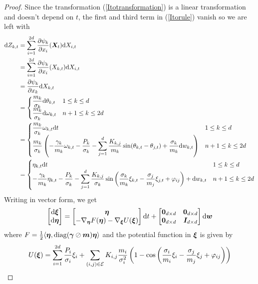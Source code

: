 \documentclass[11pt,twoside,a4paper]{article}
\begin{document}
\begin{proof}
Since the transformation (\ref{Itotransformation}) is a linear transformation and doesn't depend on $t$, the first and third term in (\ref{Itorule})  vanish so we are left with
\begin{align}
    {\rm{d}} Z_{k,t}& = \sum_{i=1}^{2d} \frac{\partial \psi_k}{\partial x_i}({\bm{X}}_t) {\rm{d}} X_{i,t} \nonumber \\ &= \sum_{i=1}^{2d} \frac{\partial \psi_k}{\partial x_i}(X_{k,t}) {\rm{d}} X_{i,t} \nonumber  \\
    &= \frac{\partial \psi_k}{\partial x_k} {\rm{d}} X_{k,t} \nonumber \\ 
    & = \begin{cases}
    \dfrac{m_k}{\sigma_k}{\rm{d}} \theta_{k,t} & 1\leq k \leq d \nonumber \\ 
     \dfrac{m_k}{\sigma_k}{\rm{d}} \omega_{k,t} & n+1 \leq k \leq 2d \\ 
    \end{cases} \nonumber \\ 
    &=  \begin{cases}
    \dfrac{m_k}{\sigma_k} \omega_{k,t} {\rm{d}} t & 1\leq k \leq d \nonumber \\ 
  \dfrac{m_k}{\sigma_k}  \left(-\dfrac{\gamma_k}{m_k} \omega_{k,t}- \dfrac{P_k}{\sigma_k}- \displaystyle \sum_{j=1}^d \dfrac{K_{k,j}}{m_k}\sin(\theta_{k,t}-\theta_{j,t})+ \dfrac{\sigma_k}{m_k}{\rm{d}} w_{k,t}\right) & n+1 \leq k \leq 2d
    \end{cases} \nonumber \\ 
    & = \begin{cases}
    \eta_{k,t} {\rm{d}} t & 1\leq k \leq d \nonumber \\ 
    -\dfrac{\gamma_k}{m_k} \eta_{k,t}- \dfrac{P_k}{\sigma_k}- \displaystyle \sum_{j=1}^d \dfrac{K_{k,j}}{\sigma_k}\sin\left(\dfrac{\sigma_k}{m_k}\xi_{k,t}-\dfrac{\sigma_j}{m_j}\xi_{j,t}+\varphi_{ij}\right)+{\rm{d}} w_{k,t} & n+1 \leq k \leq 2d
    \end{cases} 
\end{align}
Writing in vector form, we get 
\begin{align}
\begin{bmatrix}
{\rm{d}} {\bm{\xi}} \\
  {\rm{d}} {\bm{\eta}}
\end{bmatrix}
= \begin{bmatrix}
 {\bm{\eta}} \\ 
      -\nabla_{{\bm{\eta}}}F({\bm{\eta}})- \nabla_{{\bm{\xi}}}U({\bm{\xi}}) 
\end{bmatrix} {\rm{d}} t
+
 \begin{bmatrix}
     \bm{0}_{d\times d} & \bm{0}_{d\times d} \\ 
   \bm{0}_{d\times d}&\bm{I}_{d\times d}
    \end{bmatrix} {\rm{d}} \bm{w}
\end{align}
where $F=\frac{1}{2} \langle {\bm{\eta}},{\rm{diag}}({\bm{\gamma}}\oslash {\bm{m}}){\bm{\eta}} \rangle$ and the potential function in ${\bm{\xi}}$ is given by
\begin{align}
    U({\bm{\xi}}) = \sum_{i=1}^{2d}\frac{P_i}{\sigma_i} \xi_i + \sum_{(i,j)\in \mathcal{E}} K_{i,j}\frac{m_i}{\sigma_i^2}\left( 1-\cos\left(\dfrac{\sigma_i}{m_i}\xi_i-\frac{\sigma_j}{m_j}\xi_j + \varphi_{ij}\right)\right)
\end{align}
\end{proof}
\end{document}
